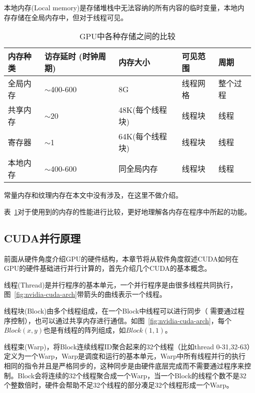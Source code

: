 本地内存(Local memory)是存储堆栈中无法容纳的所有内容的临时变量，本地内存存储在全局内存中，但对于线程可见。
\begin{table}[htbp]
	\centering
	\begin{minipage}{0.9\textwidth}
		\caption{GPU中各种存储之间的比较}
		\label{tab:memory}
		\begin{tabular}{p{2cm}p{2.1cm}p{3cm}p{2cm}p{2cm}}
			\toprule[1.5pt]
			{\heiti 内存种类} & {\heiti 访存延时} (时钟周期)&{\heiti 内存大小} &{\heiti 可见范围} &{\heiti 周期}\\\midrule[1pt]
			全局内存  & $\sim$400-600 & 8G  & 线程网格  & 整个过程 \\
			共享内存 & $\sim$20 & 48K(每个线程块) & 线程块 & 线程 \\
			寄存器 & $\sim$1 & 64K(每个线程块) & 线程块 & 线程 \\
			本地内存 & $\sim$400-600 & 同全局内存 & 线程块 & 线程 \\
			\bottomrule[1.5pt]
		\end{tabular}
	\end{minipage}
\end{table}

常量内存和纹理内存在本文中没有涉及，在这里不做介绍。

表~\ref{tab:memory}对于使用到的内存的性能进行比较，更好地理解各内存在程序中所起的功能。

\subsection{CUDA并行原理}

前面从硬件角度介绍GPU的硬件结构，本章节将从软件角度叙述CUDA如何在GPU的硬件基础进行并行计算的，首先介绍几个CUDA的基本概念。

线程(Thread)是并行程序的基本单元，一个并行程序是由很多线程共同执行，图~\ref{fig:nvidia-cuda-arch}带箭头的曲线表示一个线程。

线程块(Block)由多个线程组成，在一个Block中线程可以进行同步（ 需要通过程序控制），也可以通过共享内存进行通信。如图~\ref{fig:nvidia-cuda-arch}，每个$Block(x,y)$也是有线程的阵列组成，如$Block(1,1)$。

线程束(Warp)，将Block连续线程ID聚合起来的32个线程（比如thread 0-31,32-63）定义为一个Warp，Warp是调度和运行的基本单元，Warp中所有线程并行的执行相同的指令并且是严格同步的，这种同步是由硬件底层完成而不需要通过程序来控制。Block会将连续的32个线程聚合成一个Warp，当一个Block的线程个数不是32个整数倍时，硬件会帮助不足32个线程的部分凑足32个线程形成一个Warp。

